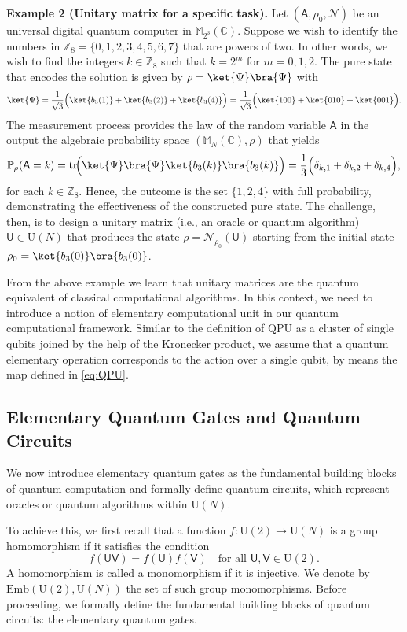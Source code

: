 \documentclass[a4paper,11pt]{article}
\DeclareMathOperator{\tr}{tr}
\newcommand{\rU}{\mathsf{U}}
\newcommand{\rV}{\mathsf{V}}
\newcommand{\rA}{\mathsf{A}}
\begin{document}
\noindent \textbf{Example 2 (Unitary matrix for a specific task).}  
Let \((\rA, \rho_0, \mathcal{N})\) be an universal digital quantum computer in \(\mathbb{M}_{2^3}(\mathbb{C})\). Suppose we wish to identify the numbers in \(\mathbb{Z}_8 = \{0,1,2,3,4,5,6,7\}\) that are powers of two. In other words, we wish to find the integers \(k \in \mathbb{Z}_8\) such that \(k = 2^m\) for \(m = 0, 1, 2\). The pure state that encodes the solution is given by $\rho = \ket{\Psi}\bra{\Psi}$ with
\[
\ket{\Psi} = \frac{1}{\sqrt{3}} \Bigl(\ket{b_3(1)} + \ket{b_3(2)} + \ket{b_3(4)}\Bigr) = \frac{1}{\sqrt{3}}\Bigl(\ket{100} + \ket{010} + \ket{001}\Bigr).
\]
The measurement process provides the law of the random variable \(\rA\) in the output the algebraic probability space \((\mathbb{M}_N(\mathbb{C}), \rho)\) that yields
\[
\mathbb{P}_{\rho}(\rA = k) = \tr\!\Bigl(\ket{\Psi}\bra{\Psi}\ket{b_3(k)}\bra{b_3(k)}\Bigr) = \frac{1}{3}\Bigl(\delta_{k,1} + \delta_{k,2} + \delta_{k,4}\Bigr),
\]
for each \(k \in \mathbb{Z}_8\). Hence, the outcome is the set \(\{1,2,4\}\) with full probability, demonstrating the effectiveness of the constructed pure state. The challenge, then, is to design a unitary matrix (i.e., an oracle or quantum algorithm) \(\rU \in \mathrm{U}(N)\) that produces the state \(\rho = \mathcal{N}_{\rho_0}(\rU)\) starting from the initial state \(\rho_0 = \ket{b_3(0)}\bra{b_3(0)}\).

\bigskip

From the above example we learn that unitary matrices are the quantum equivalent of classical computational algorithms. In this context, we need to introduce a notion of elementary computational unit in our quantum computational framework. Similar to the definition of QPU as a cluster of single qubits joined by the help of the Kronecker product, we assume that a quantum elementary operation corresponds to the action over a single qubit, by means the map defined in \eqref{eq:QPU}.

\subsection{Elementary Quantum Gates and Quantum Circuits}

We now introduce elementary quantum gates as the fundamental building blocks of quantum computation and formally define quantum circuits, which represent oracles or quantum algorithms within \(\mathrm{U}(N)\).

\bigskip

To achieve this, we first recall that a function \( f : \mathrm{U}(2) \to \mathrm{U}(N) \) is a group homomorphism if it satisfies the condition  
\[
f(\rU \rV) = f(\rU) f(\rV) \quad \text{for all } \rU, \rV \in \mathrm{U}(2).
\]
A homomorphism is called a monomorphism if it is injective. We denote by \(\mathrm{Emb}(\mathrm{U}(2),\mathrm{U}(N))\) the set of such group monomorphisms.
Before proceeding, we formally define the fundamental building blocks of quantum circuits: the elementary quantum gates.
\end{document}
